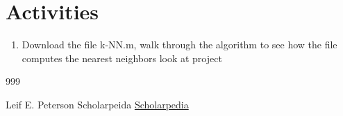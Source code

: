 \documentclass[10pt,a4paper]{article}
\begin{document}
\section{Activities}
	\begin{enumerate}
			\item Download the file k-NN.m, walk through the algorithm to see how the file computes the nearest neighbors
				\subitem look at project
	\end{enumerate}


\begin {thebibliography}{999}

	Leif E. Peterson
	Scholarpeida
	\href{http://www.scholarpedia.org/article/K-nearest_neighbor}{Scholarpedia}
	
\end{thebibliography}
\end{document}
